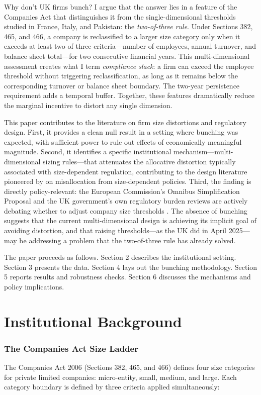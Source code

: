 \documentclass[12pt]{article}
\begin{document}
Why don't UK firms bunch? I argue that the answer lies in a feature of the Companies Act that distinguishes it from the single-dimensional thresholds studied in France, Italy, and Pakistan: the \textit{two-of-three rule}. Under Sections 382, 465, and 466, a company is reclassified to a larger size category only when it exceeds at least two of three criteria---number of employees, annual turnover, and balance sheet total---for two consecutive financial years. This multi-dimensional assessment creates what I term \textit{compliance slack}: a firm can exceed the employee threshold without triggering reclassification, as long as it remains below the corresponding turnover or balance sheet boundary. The two-year persistence requirement adds a temporal buffer. Together, these features dramatically reduce the marginal incentive to distort any single dimension.

This paper contributes to the literature on firm size distortions and regulatory design. First, it provides a clean null result in a setting where bunching was expected, with sufficient power to rule out effects of economically meaningful magnitude. Second, it identifies a specific institutional mechanism---multi-dimensional sizing rules---that attenuates the allocative distortion typically associated with size-dependent regulation, contributing to the design literature pioneered by \citet{hsieh2009} on misallocation from size-dependent policies. Third, the finding is directly policy-relevant: the European Commission's Omnibus Simplification Proposal and the UK government's own regulatory burden reviews are actively debating whether to adjust company size thresholds \citep{eu2023omnibus}. The absence of bunching suggests that the current multi-dimensional design is achieving its implicit goal of avoiding distortion, and that raising thresholds---as the UK did in April 2025---may be addressing a problem that the two-of-three rule has already solved.

The paper proceeds as follows. Section 2 describes the institutional setting. Section 3 presents the data. Section 4 lays out the bunching methodology. Section 5 reports results and robustness checks. Section 6 discusses the mechanisms and policy implications.


\section{Institutional Background}

\subsubsection*{The Companies Act Size Ladder} The Companies Act 2006 (Sections 382, 465, and 466) defines four size categories for private limited companies: micro-entity, small, medium, and large. Each category boundary is defined by three criteria applied simultaneously:
\end{document}
